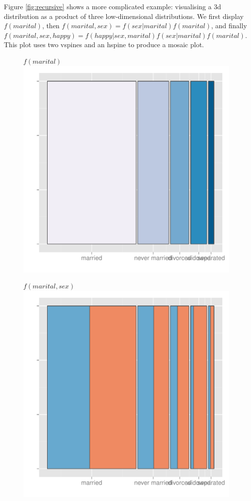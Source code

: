 \documentclass[journal]{vgtc}
\begin{document}
Figure \ref{fig:recursive} shows a more complicated example: visualising a 3d distribution as a product of three low-dimensional distributions. We first display $f(marital)$, then $f(marital, sex) = f(sex | marital) f(marital)$, and finally $f(marital, sex, happy) = f(happy | sex, marital) f(sex | marital) f(marital)$. This plot uses two vspines and an hspine to produce a mosaic plot.

\begin{figure}[htbp]
\begin{minipage}[b]{0.3\linewidth}
  	$f(marital)$
      \includegraphics[width=\linewidth]{part-comb-1}%
\end{minipage} 
\begin{minipage}[b]{0.3\linewidth}
$f(marital, sex)$ 
       \includegraphics[width=\linewidth]{part-comb-2}

\end{minipage}
\end{figure}
\end{document}
